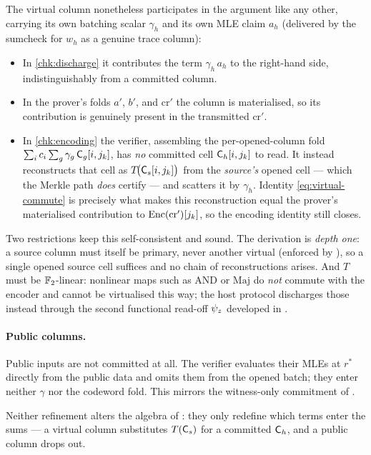 The virtual column nonetheless participates in the argument like any
other, carrying its own batching scalar $\gamma_h$ and its own MLE claim
$a_h$ (delivered by the sumcheck for $w_h$ as a genuine trace column):
\begin{itemize}[leftmargin=2em]
  \item In \ref{chk:discharge} it contributes the term $\gamma_h\,a_h$ to
    the right-hand side, indistinguishably from a committed column.
  \item In the prover's folds $a'$, $b'$, and $\mathrm{cr}'$ the column is
    materialised, so its contribution is genuinely present in the
    transmitted $\mathrm{cr}'$.
  \item In \ref{chk:encoding} the verifier, assembling the per-opened-column
    fold $\sum_i c_i\sum_g \gamma_g\,\mathsf{C}_g[i,j_k]$, has \emph{no}
    committed cell $\mathsf{C}_h[i,j_k]$ to read. It instead reconstructs that
    cell as $T\!\bigl(\mathsf{C}_s[i,j_k]\bigr)$ from the \emph{source's}
    opened cell --- which the Merkle path \emph{does} certify --- and
    scatters it by $\gamma_h$. Identity \eqref{eq:virtual-commute} is
    precisely what makes this reconstruction equal the prover's
    materialised contribution to $\operatorname{Enc}(\mathrm{cr}')[j_k]$, so the encoding
    identity still closes.
\end{itemize}
Two restrictions keep this self-consistent and sound. The derivation is
\emph{depth one}: a source column must itself be primary, never another
virtual (enforced by ), so a
single opened source cell suffices and no chain of reconstructions arises.
And $T$ must be $\mathbb{F}_2$-linear: nonlinear maps such as $\mathrm{AND}$ or
$\mathrm{Maj}$ do \emph{not} commute with the encoder and cannot be
virtualised this way; the host protocol discharges those instead through
the second functional read-off $\psi_{z}$ developed in
.

\paragraph{Public columns.}
Public inputs are not committed at all. The verifier evaluates their MLEs
at $r^*$ directly from the public data and omits them from the opened
batch; they enter neither $\gamma$ nor the codeword fold. This mirrors the
witness-only commitment of .

\medskip
Neither refinement alters the algebra of : they only
redefine which terms enter the sums --- a virtual column substitutes
$T(\mathsf{C}_s)$ for a committed $\mathsf{C}_h$, and a public column drops out.
